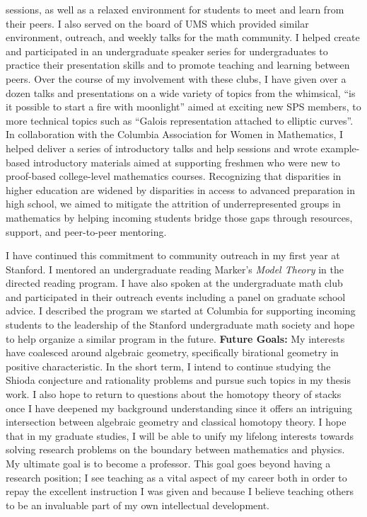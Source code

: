 \documentclass[11pt]{article}
\begin{document}
sessions, as well as a relaxed environment for students to meet and learn from their peers. I also served on
the board of UMS which provided similar environment, outreach, and weekly talks for the math
community. I helped create and participated in an undergraduate speaker series for undergraduates to
practice their presentation skills and to promote teaching and learning between peers. Over the course of
my involvement with these clubs, I have given over a dozen talks and presentations on a wide variety of topics
from the whimsical, ``is it possible to start a fire with moonlight'' aimed at exciting new SPS members, to
more technical topics such as ``Galois representation attached to elliptic curves''. In collaboration
with the Columbia Association for Women in Mathematics, I helped deliver a series of introductory talks
and help sessions and wrote example-based introductory materials aimed at supporting freshmen who
were new to proof-based college-level mathematics courses. Recognizing that disparities in higher education are widened by disparities in access to advanced preparation in high school, we aimed to mitigate the attrition of underrepresented groups in mathematics by helping incoming students bridge those gaps through resources, support, and peer-to-peer mentoring.
\par
I have continued this commitment to community outreach in my first year at Stanford. I mentored an undergraduate reading Marker's \textit{Model Theory} in the directed reading program. I have also spoken at the undergraduate math club and participated in their outreach events including a panel on graduate school advice. I described the program we started at Columbia for supporting incoming students to the leadership of the Stanford undergraduate math society and hope to help organize a similar program in the future. 
\newline
\noindent
\textbf{Future Goals:} My interests have coalesced around algebraic geometry, specifically birational geometry
in positive characteristic. In the short term, I intend to continue studying the Shioda conjecture and rationality problems and pursue such topics in my thesis work. I also hope to return to questions about the homotopy theory of stacks once I have deepened my background understanding since it offers an intriguing intersection between algebraic geometry and classical homotopy theory. I hope that in my graduate studies, I will be able to unify my lifelong interests towards solving
research problems on the boundary between mathematics and physics. My ultimate goal is to become a professor. This goal goes beyond having a research position; I see teaching as a vital aspect of my career
both in order to repay the excellent instruction I was given and because I believe teaching others to be an
invaluable part of my own intellectual development.
\vspace{-2.5em}
\begingroup
\let\enotesize\normalsize
\renewcommand\notesname{\hrulefill \vspace{-0.9em}}
\theendnotes
\endgroup
\end{document}
